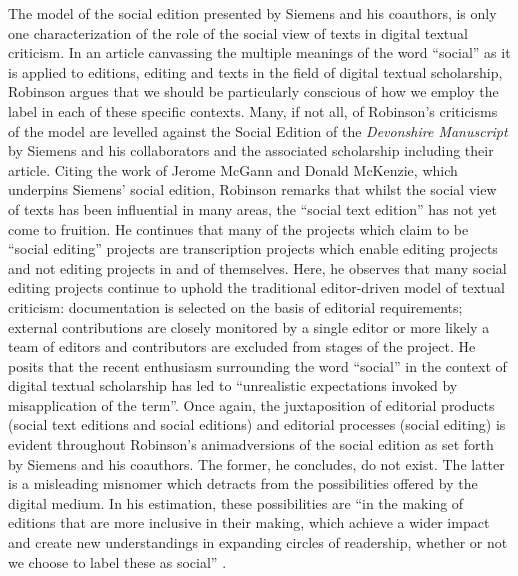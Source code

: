 \begin{paper}
The model of the social edition presented by Siemens and his coauthors, is only one characterization of the role of the social view of texts in digital textual criticism. In an article canvassing the multiple meanings of the word ``social'' as it is applied to editions, editing and texts in the field of digital textual scholarship, Robinson argues that we should be particularly conscious of how we employ the label in each of these specific contexts. Many, if not all, of Robinson’s criticisms of the model are levelled against the Social Edition of the \textit{Devonshire Manuscript} by Siemens and his collaborators and the associated scholarship including their \citeyear{siemens_modeling_2012} article. Citing the work of Jerome McGann and Donald McKenzie, which underpins Siemens’ social edition, Robinson remarks that whilst the social view of texts has been influential in many areas, the ``social text edition'' has not yet come to fruition. He continues that many of the projects which claim to be “social editing” projects are transcription projects which enable editing projects and not editing projects in and of themselves. Here, he observes that many social editing projects continue to uphold the traditional editor-driven model of textual criticism: documentation is selected on the basis of editorial requirements; external contributions are closely monitored by a single editor or more likely a team of editors and contributors are excluded from stages of the project. He posits that the recent enthusiasm surrounding the word ``social'' in the context of digital textual scholarship has led to ``unrealistic expectations invoked by misapplication of the term''. Once again, the juxtaposition of editorial products (social text editions and social editions) and editorial processes (social editing) is evident throughout Robinson’s animadversions of the social edition as set forth by Siemens and his coauthors. The former, he concludes, do not exist. The latter is a misleading misnomer which detracts from the possibilities offered by the digital medium. In his estimation, these possibilities are ``in the making of editions that are more inclusive in their making, which achieve a wider impact and create new understandings in expanding circles of readership, whether or not we choose to label these as social'' \citep{robinson_social_2016}. 


\end{paper}
